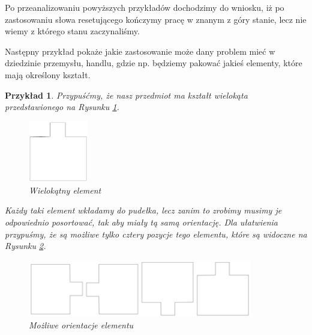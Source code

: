 \documentclass[12pt,a4paper]{article}
\newtheorem{pr}{Przyk{\l}ad}[section]
\begin{document}
Po przeanalizowaniu powy\.{z}szych przyk{\l}ad\'{o}w dochodzimy do wniosku, i\.{z} po zastosowaniu s{\l}owa resetuj\k{a}cego ko\'{n}czymy prac\k{e} w znanym z g\'{o}ry stanie, lecz nie wiemy z kt\'{o}rego stanu zaczynali\'{s}my.

Nast\k{e}pny przyk{\l}ad poka\.{z}e jakie zastosowanie mo\.{z}e dany problem mie\'{c} w dziedzinie przemys{\l}u, handlu, gdzie np. b\k{e}dziemy pakowa\'{c} jakie\'{s} elementy, kt\'{o}re maj\k{a} okre\'{s}lony kszta{\l}t.

\begin{pr}
Przypu\'{s}\'{c}my, \.{z}e nasz przedmiot ma kszta{\l}t wielok\k{a}ta przedstawionego na Rysunku \ref{fig:rysunek3}.

\begin{figure}[H]
    \centering
    \includegraphics[width=0.23\textwidth]{rysunek3}
    \caption{Wielok\k{a}tny element}
    \label{fig:rysunek3}
\end{figure}


Ka\.{z}dy taki element wk{\l}adamy do pude{\l}ka, lecz zanim to zrobimy musimy je odpowiednio posortowa\'{c}, tak aby mia{\l}y t\k{a} sam\k{a} orientacj\k{e}. Dla u{\l}atwienia przypu\'{s}my, \.{z}e s\k{a} mo\.{z}liwe tylko cztery pozycje tego elementu, kt\'{o}re s\k{a} widoczne na Rysunku \ref{fig:rysunek4}.

\begin{figure}[H]
    \centering
    \includegraphics[width=0.87\textwidth]{rysunek4}
    \caption{Mo\.{z}liwe orientacje elementu}
    \label{fig:rysunek4}
\end{figure}


\end{pr}
\end{document}

